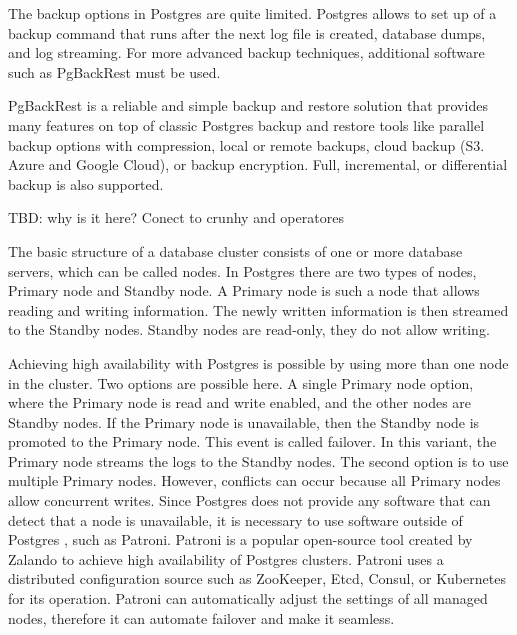 The backup options in Postgres are quite limited. Postgres allows to set up of a backup command that runs after the next log file is created, database dumps, and log streaming. For more advanced backup techniques, additional software such as PgBackRest must be used. \cite{DocuPgPITR}

PgBackRest is a reliable and simple backup and restore solution that provides many features on top of classic Postgres backup and restore tools like parallel backup options with compression, local or remote backups, cloud backup (S3. Azure and Google Cloud), or backup encryption. Full, incremental, or differential backup is also supported. \cite{PGbackRest}

TBD: why is it here? Conect to crunhy and operatores


The basic structure of a database cluster consists of one or more database servers, which can be called nodes. In Postgres there are two types of nodes, Primary node and Standby node.  A Primary node is such a node that allows reading and writing information. The newly written information is then streamed to the Standby nodes. Standby nodes are read-only, they do not allow writing. \cite{pg14replication}

Achieving high availability with Postgres is possible by using more than one node in the cluster. Two options are possible here. A single Primary node option, where the Primary node is read and write enabled, and the other nodes are Standby nodes. If the Primary node is unavailable, then the Standby node is promoted to the Primary node. This event is called failover. In this variant, the Primary node streams the logs to the Standby nodes. The second option is to use multiple Primary nodes. However, conflicts can occur because all Primary nodes allow concurrent writes. \cite{docuPgHA}
Since Postgres does not provide any software that can detect that a node is unavailable, it is necessary to use software outside of Postgres \cite{docuPgFailover}, such as Patroni.
Patroni is a popular open-source tool created by Zalando to achieve high availability of Postgres clusters. Patroni uses a distributed configuration source such as ZooKeeper, Etcd, Consul, or Kubernetes for its operation. Patroni can automatically adjust the settings of all managed nodes, therefore it can automate failover and make it seamless. \cite{PalarkMigratingPg} \cite{PatroniDocu}


